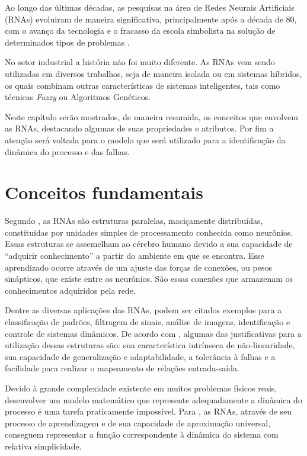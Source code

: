 \label{cap:rnas}

Ao longo das últimas décadas, as pesquisas na área de Redes Neurais Artificiais
(RNAs) evoluiram de maneira significativa, principalmente após a década de 80,
com o avanço da tecnologia e o fracasso da escola simbolista na solução de
determinados tipos de problemas \cite{braga:2007}.

No setor industrial a história não foi muito diferente. As RNAs vem sendo
utilizadas em diversos trabalhos, seja de maneira isolada ou em sistemas
híbridos, os quais combinam outras características de sistemas inteligentes,
tais como técnicas {\it Fuzzy} ou Algoritmos Genéticos.

Neste capítulo serão mostrados, de maneira resumida, os conceitos que envolvem
as RNAs, destacando algumas de suas propriedades e atributos. Por fim a atenção
será voltada para o modelo que será utilizado para a identificação da dinâmica
do processo e das falhas.

\section{Conceitos fundamentais}
Segundo , as RNAs são estruturas paralelas, maciçamente
distribuídas, constituídas por unidades simples de processamento conhecida como
neurônios. Essas estruturas se assemelham ao cérebro humano devido a sua
capacidade de ``adquirir conhecimento'' a partir do ambiente em que se encontra.
Esse aprendizado ocorre através de um ajuste das forças de conexões, ou pesos
sinápticos, que existe entre os neurônios. São essas conexões que armazenam os
conhecimentos adquiridos pela rede.

Dentre as diversas aplicações das RNAs, podem ser citados exemplos para a
classificação de padrões, filtragem de sinais, análise de imagens, identificação
e controle de sistemas dinâmicos. De acordo com ,
algumas das justificativas para a utilização dessas estruturas são: sua
característica intrínseca de não-linearidade, sua capacidade de generalização e
adaptabilidade, a tolerância à falhas e a facilidade para realizar o mapeamento
de relações entrada-saída.

Devido à grande complexidade existente em muitos problemas físicos reais,
desenvolver um modelo matemático que represente adequadamente a dinâmica do
processo é uma tarefa praticamente impossível. Para ,
as RNAs, através de seu processo de aprendizagem e de sua capacidade de
aproximação universal, conseguem representar a função correspondente à dinâmica
do sistema com relativa simplicidade.

